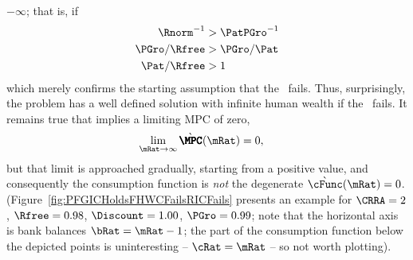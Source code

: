 \documentclass[../BufferStockTheory.tex]{subfiles}
\begin{document}
$-\infty$; that is, if
\begin{eqnarray*}
  \Rnorm^{-1}  & > \PatPGro^{-1}
\\ \PGro/\Rfree  & > \PGro/\Pat
\\ \Pat/\Rfree  & > 1
\end{eqnarray*}
which merely confirms the starting assumption that the \RIC~fails.
Thus, surprisingly, the problem has a well defined solution with
infinite human wealth if the \RIC~fails.  It remains true that \cncl{\RIC}
implies a limiting MPC of zero,
\begin{align}
  \lim_{\mRat \rightarrow \infty} \grave{\pmb{\MPC}}(\mRat)   & = 0,
\end{align}
but that limit is approached gradually, starting from a positive
value, and consequently the consumption function is {\it not} the
degenerate $\grave{\cFunc}(\mRat)=0$.  (Figure~\ref{fig:PFGICHoldsFHWCFailsRICFails} presents an example for $\CRRA=2$, $\Rfree=0.98$, $\Discount = 1.00$, $\PGro = 0.99$; note that the horizontal axis is bank balances $\bRat = \mRat-1$; the part of the consumption function below the depicted points is uninteresting -- $\cRat = \mRat$ -- so not worth plotting).


% 

\end{document}
